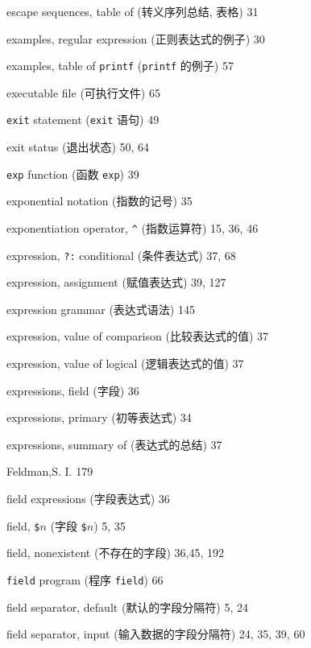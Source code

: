 \begin{multicols}{2}
\hangindent=2pc  escape sequences, table of (转义序列总结,
表格) 31

\hangindent=2pc  examples, regular expression (正则表达式的例子) 30

\hangindent=2pc  examples, table of \verb'printf'
(\verb'printf' 的例子) 57

\hangindent=2pc  executable file (可执行文件) 65

\hangindent=2pc  \verb'exit' statement (\verb'exit' 语句) 49

\hangindent=2pc  exit status (退出状态) 50, 64

\hangindent=2pc  \verb'exp' function (函数 \verb'exp') 39

\hangindent=2pc  exponential notation (指数的记号) 35

\hangindent=2pc  exponentiation operator, \verb'^' (指数运算符)
15, 36, 46

\hangindent=2pc  expression, \verb'?:' conditional (条件表达式)
37, 68

\hangindent=2pc  expression, assignment (赋值表达式) 39, 127

\hangindent=2pc  expression grammar (表达式语法) 145

\hangindent=2pc  expression, value of comparison (比较表达式的值) 37

\hangindent=2pc  expression, value of logical (逻辑表达式的值) 37

\hangindent=2pc  expressions, field (字段) 36

\hangindent=2pc  expressions, primary (初等表达式) 34

\hangindent=2pc  expressions, summary of (表达式的总结) 37

\hangindent=2pc  Feldman,S. I. 179

\hangindent=2pc  field expressions (字段表达式) 36

\hangindent=2pc  field, \verb'$'$n$ (字段 \verb'$'$n$) 5, 35

\hangindent=2pc  field, nonexistent (不存在的字段) 36,45, 192

\hangindent=2pc  \verb'field' program (程序 \verb'field') 66

\hangindent=2pc  field separator, default (默认的字段分隔符) 5, 24

\hangindent=2pc  field separator, input (输入数据的字段分隔符)
24, 35, 39, 60


\end{multicols}
